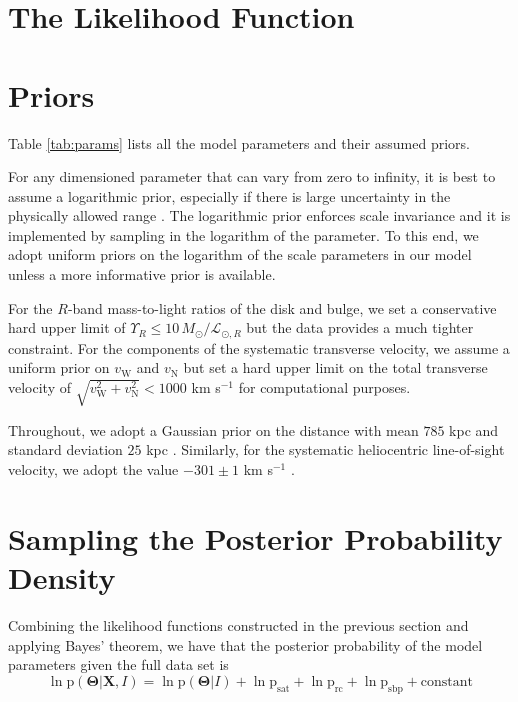 \documentclass[preprint,12pt]{aastex}
\newcommand{\Tab}[1]{Table \ref{tab:#1}}
\newcommand{\eqlabel}[1]{\label{eq:#1}}
\begin{document}
\section{The Likelihood Function}





\section{Priors}

\label{sect:priors}

\Tab{params} lists all the model parameters and their assumed priors.

For any dimensioned parameter that can vary from zero to infinity, it is best to
assume a logarithmic prior, especially if there is large uncertainty in the
physically allowed range \citep{Gregory:2005}.  The logarithmic prior enforces
scale invariance and it is implemented by sampling in the logarithm of the parameter.
To this end, we adopt uniform priors on the logarithm of the scale parameters in
our model unless a more informative prior is available.

For the $R$-band mass-to-light ratios of the disk and bulge, we set a conservative
hard upper limit of $\Upsilon_R \le 10 \, M_\odot /\mathcal{L}_{\odot,R}$ but
the data provides a much tighter constraint.  For the components of the systematic
transverse velocity, we assume a uniform prior on $v_\mathrm{W}$ and $v_\mathrm{N}$
but set a hard upper limit on the total transverse velocity of
$\sqrt{v_\mathrm{W}^2+v_\mathrm{N}^2} < 1000$ km s$^{-1}$ for computational purposes.

Throughout, we adopt a Gaussian prior on the distance with mean $785$ kpc and
standard deviation $25$ kpc \citep{McConnachie:2005,McConnachie:2006}.  Similarly,
for the systematic heliocentric line-of-sight velocity, we adopt the value
$-301 \pm 1$ km s$^{-1}$ \citep{Courteau:1999}.

\section{Sampling the Posterior Probability Density}

Combining the likelihood functions constructed in the previous section and
applying Bayes' theorem, we have that the posterior probability of the model
parameters given the full data set is
\begin{equation}
    \eqlabel{fullposterior}
    \ln \mathrm{p} (\mathbf{\Theta} | \mathbf{X}, I) =
    \ln \mathrm{p} (\mathbf{\Theta} | I) +  \ln \mathrm{p}_\mathrm{sat}
    + \ln \mathrm{p}_\mathrm{rc}
    + \ln \mathrm{p}_\mathrm{sbp} + \mathrm{constant}
\end{equation}
\end{document}
